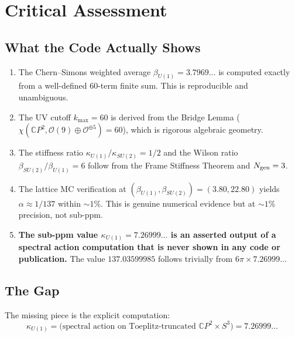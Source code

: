 \documentclass[11pt]{article}
\begin{document}
\section{Critical Assessment}

\subsection{What the Code Actually Shows}

\begin{enumerate}
\item The Chern--Simons weighted average $\beta_{U(1)} = 3.7969\ldots$
  is computed exactly from a well-defined 60-term finite sum. This is
  reproducible and unambiguous.

\item The UV cutoff $k_{\max} = 60$ is derived from the Bridge Lemma
  ($\chi(\mathbb{C}P^2, \mathcal{O}(9) \oplus \mathcal{O}^{\oplus 5}) = 60$),
  which is rigorous algebraic geometry.

\item The stiffness ratio $\kappa_{U(1)}/\kappa_{SU(2)} = 1/2$ and the
  Wilson ratio $\beta_{SU(2)}/\beta_{U(1)} = 6$ follow from the Frame
  Stiffness Theorem and $N_{\rm gen} = 3$.

\item The lattice MC verification at $(\beta_{U(1)}, \beta_{SU(2)}) = (3.80, 22.80)$
  yields $\alpha \approx 1/137$ within $\sim 1\%$. This is genuine
  numerical evidence but at $\sim 1\%$ precision, not sub-ppm.

\item \textbf{The sub-ppm value $\kappa_{U(1)} = 7.26999\ldots$ is an
  asserted output of a spectral action computation that is never shown
  in any code or publication.} The value $137.03599985$ follows trivially
  from $6\pi \times 7.26999\ldots$
\end{enumerate}

\subsection{The Gap}

The missing piece is the explicit computation:
\begin{equation}
\kappa_{U(1)} = \text{(spectral action on Toeplitz-truncated }
\mathbb{C}P^2 \times S^3\text{)} = 7.26999\ldots
\end{equation}
\end{document}
